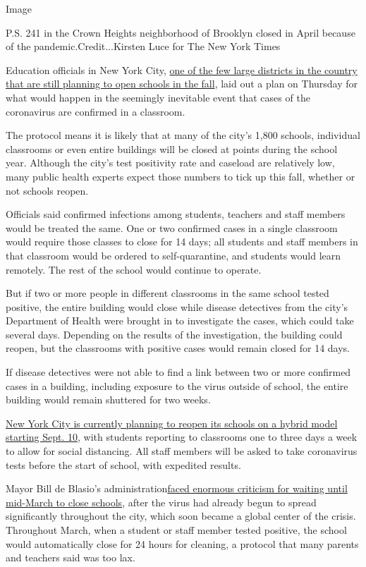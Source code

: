 Image

P.S. 241 in the Crown Heights neighborhood of Brooklyn closed in April
because of the pandemic.Credit...Kirsten Luce for The New York Times

Education officials in New York City,
\href{https://www.nytimes.com/2020/07/14/us/coronavirus-schools-fall.html}{one
of the few large districts in the country that are still planning to
open schools in the fall}, laid out a plan on Thursday for what would
happen in the seemingly inevitable event that cases of the coronavirus
are confirmed in a classroom.

The protocol means it is likely that at many of the city's 1,800
schools, individual classrooms or even entire buildings will be closed
at points during the school year. Although the city's test positivity
rate and caseload are relatively low, many public health experts expect
those numbers to tick up this fall, whether or not schools reopen.

Officials said confirmed infections among students, teachers and staff
members would be treated the same. One or two confirmed cases in a
single classroom would require those classes to close for 14 days; all
students and staff members in that classroom would be ordered to
self-quarantine, and students would learn remotely. The rest of the
school would continue to operate.

But if two or more people in different classrooms in the same school
tested positive, the entire building would close while disease
detectives from the city's Department of Health were brought in to
investigate the cases, which could take several days. Depending on the
results of the investigation, the building could reopen, but the
classrooms with positive cases would remain closed for 14 days.

If disease detectives were not able to find a link between two or more
confirmed cases in a building, including exposure to the virus outside
of school, the entire building would remain shuttered for two weeks.

\href{https://www.nytimes.com/2020/07/08/nyregion/nyc-schools-reopening-plan.html}{New
York City is currently planning to reopen its schools on a hybrid model
starting Sept. 10}, with students reporting to classrooms one to three
days a week to allow for social distancing. All staff members will be
asked to take coronavirus tests before the start of school, with
expedited results.

Mayor Bill de Blasio's
administration\href{https://www.nytimes.com/2020/07/06/nyregion/nyc-school-reopening-plan.html}{faced
enormous criticism for waiting until mid-March to close schools}, after
the virus had already begun to spread significantly throughout the city,
which soon became a global center of the crisis. Throughout March, when
a student or staff member tested positive, the school would
automatically close for 24 hours for cleaning, a protocol that many
parents and teachers said was too lax.


